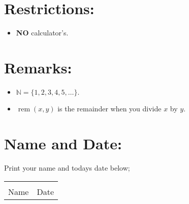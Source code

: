 \documentclass[12pt]{article} %
\begin{document}
	\section{Restrictions:}
  \begin{itemize}
		\item \textbf{NO} calculator's.
  \end{itemize}
  \section{Remarks:}
  \begin{itemize}
    \item $\mathbb N = \{1,2,3,4,5,\dots\} $.
    \item $\operatorname{rem}(x,y)$ is the remainder when you divide $x$ by $y$.
  \end{itemize}
	\section{Name and Date:}
	Print your name and todays date below;\\

	\begin{center}
	\noindent\begin{tabular}{ll}
		\makebox[3in]{\hrulefill} & \makebox[3in]{\hrulefill}\\
		Name & Date\\[8ex]%
	\end{tabular}
	\end{center}
	\newpage
\end{document}
